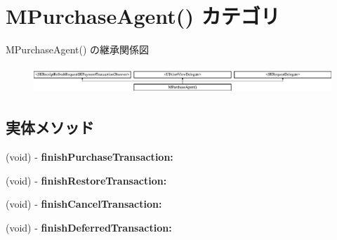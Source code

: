 \hypertarget{category_m_purchase_agent_07_08}{}\section{M\+Purchase\+Agent() カテゴリ}
\label{category_m_purchase_agent_07_08}
M\+Purchase\+Agent() の継承関係図\begin{figure}[H]
\begin{center}
\leavevmode
\includegraphics[height=1.025641cm]{category_m_purchase_agent_07_08}
\end{center}
\end{figure}
\subsection*{実体メソッド}
\begin{DoxyCompactItemize}
\item 
\hypertarget{category_m_purchase_agent_07_08_a6783aef5ae69a99360fd9df2af2a9615}{}(void) -\/ {\bfseries finish\+Purchase\+Transaction\+:}\label{category_m_purchase_agent_07_08_a6783aef5ae69a99360fd9df2af2a9615}

\item 
\hypertarget{category_m_purchase_agent_07_08_ae3eeb6538e5fb97a08c8d9a976bf205c}{}(void) -\/ {\bfseries finish\+Restore\+Transaction\+:}\label{category_m_purchase_agent_07_08_ae3eeb6538e5fb97a08c8d9a976bf205c}

\item 
\hypertarget{category_m_purchase_agent_07_08_a6e20406c950db847f450873e55eb3370}{}(void) -\/ {\bfseries finish\+Cancel\+Transaction\+:}\label{category_m_purchase_agent_07_08_a6e20406c950db847f450873e55eb3370}

\item 
\hypertarget{category_m_purchase_agent_07_08_ae07572bcf409b4cbfaeadc043005bef8}{}(void) -\/ {\bfseries finish\+Deferred\+Transaction\+:}\label{category_m_purchase_agent_07_08_ae07572bcf409b4cbfaeadc043005bef8}

\end{DoxyCompactItemize}
